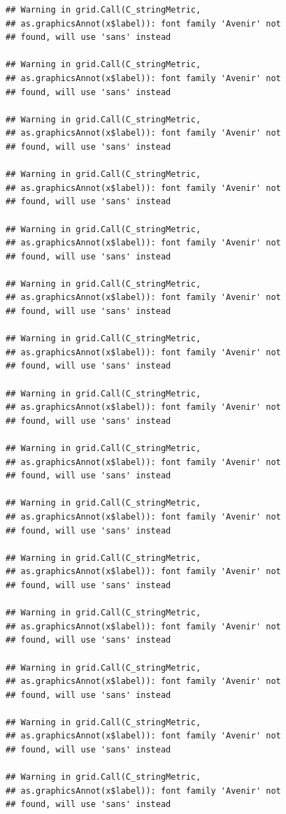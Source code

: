 \documentclass[]{krantz}
\begin{document}
\begin{verbatim}
## Warning in grid.Call(C_stringMetric,
## as.graphicsAnnot(x$label)): font family 'Avenir' not
## found, will use 'sans' instead

## Warning in grid.Call(C_stringMetric,
## as.graphicsAnnot(x$label)): font family 'Avenir' not
## found, will use 'sans' instead

## Warning in grid.Call(C_stringMetric,
## as.graphicsAnnot(x$label)): font family 'Avenir' not
## found, will use 'sans' instead

## Warning in grid.Call(C_stringMetric,
## as.graphicsAnnot(x$label)): font family 'Avenir' not
## found, will use 'sans' instead

## Warning in grid.Call(C_stringMetric,
## as.graphicsAnnot(x$label)): font family 'Avenir' not
## found, will use 'sans' instead

## Warning in grid.Call(C_stringMetric,
## as.graphicsAnnot(x$label)): font family 'Avenir' not
## found, will use 'sans' instead

## Warning in grid.Call(C_stringMetric,
## as.graphicsAnnot(x$label)): font family 'Avenir' not
## found, will use 'sans' instead

## Warning in grid.Call(C_stringMetric,
## as.graphicsAnnot(x$label)): font family 'Avenir' not
## found, will use 'sans' instead

## Warning in grid.Call(C_stringMetric,
## as.graphicsAnnot(x$label)): font family 'Avenir' not
## found, will use 'sans' instead

## Warning in grid.Call(C_stringMetric,
## as.graphicsAnnot(x$label)): font family 'Avenir' not
## found, will use 'sans' instead

## Warning in grid.Call(C_stringMetric,
## as.graphicsAnnot(x$label)): font family 'Avenir' not
## found, will use 'sans' instead

## Warning in grid.Call(C_stringMetric,
## as.graphicsAnnot(x$label)): font family 'Avenir' not
## found, will use 'sans' instead

## Warning in grid.Call(C_stringMetric,
## as.graphicsAnnot(x$label)): font family 'Avenir' not
## found, will use 'sans' instead

## Warning in grid.Call(C_stringMetric,
## as.graphicsAnnot(x$label)): font family 'Avenir' not
## found, will use 'sans' instead

## Warning in grid.Call(C_stringMetric,
## as.graphicsAnnot(x$label)): font family 'Avenir' not
## found, will use 'sans' instead


\end{verbatim}
\end{document}
